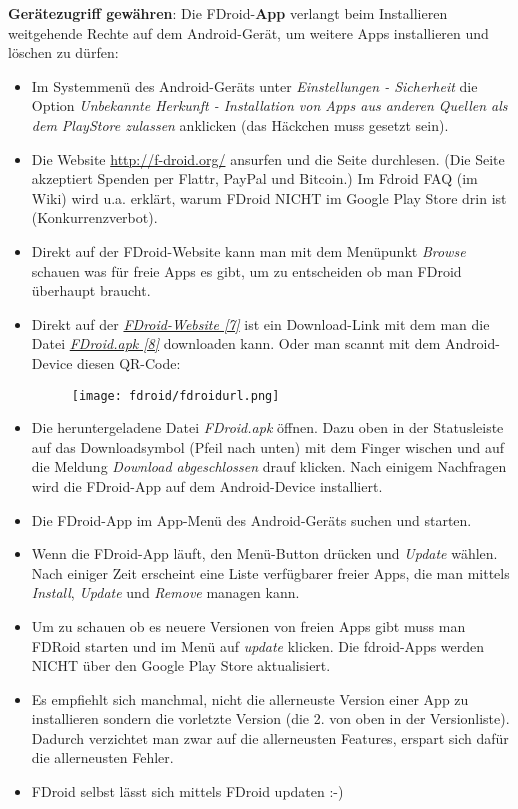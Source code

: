 \textbf{Gerätezugriff gewähren}: Die FDroid-\textbf{App} verlangt beim Installieren weitgehende Rechte auf dem Android-Gerät, um weitere Apps installieren und löschen zu dürfen:

\begin{itemize}
\item Im Systemmenü des Android-Geräts unter \emph{Einstellungen - Sicherheit} die Option \emph{Unbekannte Herkunft - Installation von Apps aus anderen Quellen als dem PlayStore zulassen} anklicken (das Häckchen muss gesetzt sein).
\item Die Website \url{http://f-droid.org/} ansurfen und die Seite durchlesen. (Die Seite akzeptiert Spenden per Flattr, PayPal und Bitcoin.) Im Fdroid FAQ (im Wiki) wird u.a. erklärt, warum FDroid NICHT im Google Play Store drin ist (Konkurrenzverbot).
\item Direkt auf der FDroid-Website kann man mit dem Menüpunkt \emph{Browse} schauen was für freie Apps es gibt, um zu entscheiden ob man FDroid überhaupt braucht.
\item Direkt auf der \href{http://f-droid.org/}{\textit{FDroid-Website [7]}} ist ein Download-Link mit dem man die Datei \href{http://f-droid.org/FDroid.apk}{\textit{FDroid.apk [8]}} downloaden kann. Oder man scannt mit dem Android-Device diesen QR-Code:

\begin{figure}
\texttt{[image: fdroid/fdroidurl.png]}
\end{figure}

\item Die heruntergeladene Datei \emph{FDroid.apk} öffnen. Dazu oben in der Statusleiste auf das Downloadsymbol (Pfeil nach unten) mit dem Finger wischen und auf die Meldung \emph{Download abgeschlossen} drauf klicken. Nach einigem Nachfragen wird die FDroid-App auf dem Android-Device installiert.
\item Die FDroid-App im App-Menü des Android-Geräts suchen und starten.
\item Wenn die FDroid-App läuft, den Menü-Button drücken und \emph{Update} wählen. Nach einiger Zeit erscheint eine Liste verfügbarer freier Apps, die man mittels \textit{Install}, \textit{Update} und \textit{Remove} managen kann.
\item Um zu schauen ob es neuere Versionen von freien Apps gibt muss man FDRoid starten und im Menü auf \textit{update} klicken. Die fdroid-Apps werden NICHT über den Google Play Store aktualisiert.
\item Es empfiehlt sich manchmal, nicht die allerneuste Version einer App zu installieren sondern die vorletzte Version (die 2. von oben in der Versionliste). Dadurch verzichtet man zwar auf die allerneusten Features, erspart sich dafür die allerneusten Fehler.
\item FDroid selbst lässt sich mittels FDroid updaten :-)
\end{itemize}

